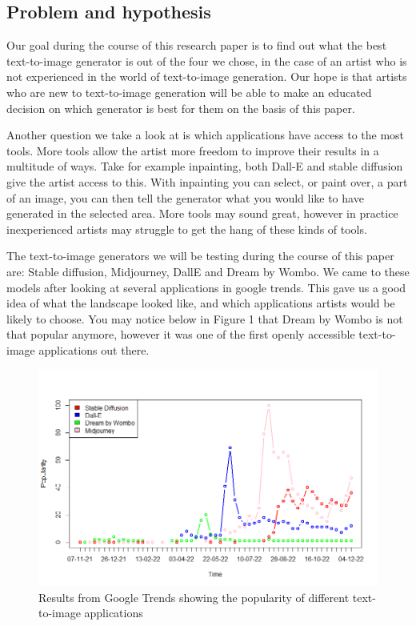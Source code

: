 \documentclass[]{report}
\begin{document}
	\subsection{Problem and hypothesis}
Our goal during the course of this research paper is to find out what the best text-to-image generator is out of the four we chose, in the case of an artist who is not experienced in the world of text-to-image generation. Our hope is that artists who are new to text-to-image generation will be able to make an educated decision on which generator is best for them on the basis of this paper.

Another question we take a look at is which applications have access to the most tools. More tools allow the artist more freedom to improve their results in a multitude of ways. Take for example inpainting, both Dall-E and stable diffusion give the artist access to this. With inpainting you can select, or paint over, a part of an image, you can then tell the generator what you would like to have generated in the selected area. More tools may sound great, however in practice inexperienced artists may struggle to get the hang of these kinds of tools.

The text-to-image generators we will be testing during the course of this paper are: Stable diffusion, Midjourney, DallE and Dream by Wombo. We came to these models after looking at several applications in google trends. This gave us a good idea of what the landscape looked like, and which applications artists would be likely to choose. You may notice below in Figure 1 that Dream by Wombo is not that popular anymore, however it was one of the first openly accessible text-to-image applications out there.

\begin{figure}[!htb]
	\centering
	\includegraphics[width=1\linewidth]{TrendsPlotWithLegend}
	\caption{Results from Google Trends showing the popularity of different text-to-image applications}
	\label{fig:TrendsPlotWithLegend}
\end{figure}
\end{document}
